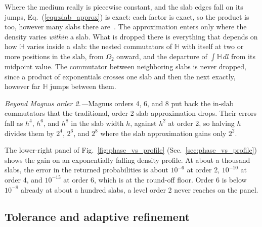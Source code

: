 \documentclass[final,5p,times,twocolumn,sort,compress]{elsarticle}
\makeatletter
\newcommand{\eq}{Eq.}
\newcommand{\fig}{Fig.}
\DeclareRobustCommand{\_}{%
  \ifmmode\nfss@text{\textunderscore}\else\textunderscore\allowbreak\fi}
\newcommand{\equ}[1]{\eq~(\ref{equ:#1})}
\newcommand{\figu}[1]{\fig~\ref{fig:#1}}
\makeatother
\begin{document}
Where the medium really is piecewise constant, and the slab edges fall on its jumps, \equ{slab_approx} is exact: each factor is exact, so the product is too, however many slabs there are\ \cite{Bustamante:2019ggq}. The approximation enters only where the density varies \emph{within} a slab. What is dropped there is everything that depends on how $\mathbb{H}$ varies inside a slab: the nested commutators of $\mathbb{H}$ with itself at two or more positions in the slab, from $\Omega_2$ onward, and the departure of $\int \mathbb{H}\,dl$ from its midpoint value. The commutator between neighboring slabs is never dropped, since a product of exponentials crosses one slab and then the next exactly, however far $\mathbb{H}$ jumps between them.  

\smallskip

\textit{Beyond Magnus order 2.---}Magnus orders 4, 6, and 8 put back the in-slab commutators that the traditional, order-2 slab approximation drops. Their errors fall as $h^{4}$, $h^{6}$, and $h^{8}$ in the slab width $h$, against $h^{2}$ at order 2, so halving $h$ divides them by $2^{4}$, $2^{6}$, and $2^{8}$ where the slab approximation gains only $2^{2}$. 

The lower-right panel of \figu{phase_vs_profile} (Sec.~\ref{sec:phase_vs_profile}) shows the gain on an exponentially falling density profile. At about a thousand slabs, the error in the returned probabilities is about $10^{-6}$ at order 2, $10^{-10}$ at order 4, and $10^{-15}$ at order 6, which is at the round-off floor. Order 6 is below $10^{-8}$ already at about a hundred slabs, a level order 2 never reaches on the panel.


\subsection{Tolerance and adaptive refinement}
\label{sec:refinement}
\end{document}
